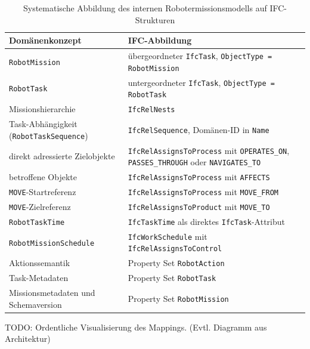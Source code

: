 \begin{table}[htbp]
  \centering
  \small
  \renewcommand{\arraystretch}{1.3}
  \begin{tabularx}{\textwidth}{@{}|>{\raggedright\arraybackslash}p{}|X|@{}}
    \hline
    \textbf{Domänenkonzept} & \textbf{IFC-Abbildung} \\
    \hline
    \texttt{RobotMission}
      & übergeordneter \texttt{IfcTask}, \texttt{ObjectType = RobotMission} \\
    \hline
    \texttt{RobotTask}
      & untergeordneter \texttt{IfcTask}, \texttt{ObjectType = RobotTask} \\
    \hline
    Missionshierarchie
      & \texttt{IfcRelNests} \\
    \hline
    Task-Abhängigkeit (\texttt{RobotTaskSequence})
      & \texttt{IfcRelSequence}, Domänen-ID in \texttt{Name} \\
    \hline
    direkt adressierte Zielobjekte
      & \texttt{IfcRelAssignsToProcess} mit \texttt{OPERATES\_ON}, \texttt{PASSES\_THROUGH} oder \texttt{NAVIGATES\_TO} \\
    \hline
    betroffene Objekte
      & \texttt{IfcRelAssignsToProcess} mit \texttt{AFFECTS} \\
    \hline
    \texttt{MOVE}-Startreferenz
      & \texttt{IfcRelAssignsToProcess} mit \texttt{MOVE\_FROM} \\
    \hline
    \texttt{MOVE}-Zielreferenz
      & \texttt{IfcRelAssignsToProduct} mit \texttt{MOVE\_TO} \\
    \hline
    \texttt{RobotTaskTime}
      & \texttt{IfcTaskTime} als direktes \texttt{IfcTask}-Attribut \\
    \hline
    \texttt{RobotMissionSchedule}
      & \texttt{IfcWorkSchedule} mit \texttt{IfcRelAssignsToControl} \\
    \hline
    Aktionssemantik
      & Property Set \texttt{RobotAction} \\
    \hline
    Task-Metadaten
      & Property Set \texttt{RobotTask} \\
    \hline
    Missionsmetadaten und Schemaversion
      & Property Set \texttt{RobotMission} \\
    \hline
  \end{tabularx}
  \caption{Systematische Abbildung des internen Robotermissionsmodells auf IFC-Strukturen}
  \label{tab:mapping-domaene-ifc}
\end{table}
\FloatBarrier

TODO: Ordentliche Visualisierung des Mappings. (Evtl. Diagramm aus Architektur)


